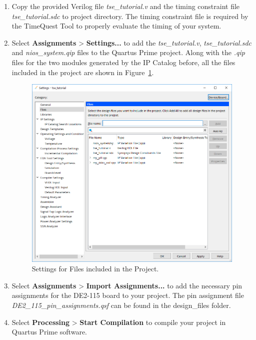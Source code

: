 \documentclass[11pt, twoside, pdftex]{article}
\begin{document}
\begin{enumerate}
	\item Copy the provided Verilog file {\it tse\_tutorial.v} and the timing constraint file {\it tse\_tutorial.sdc} to project directory. The timing constraint file is required by the TimeQuest Tool to properly evaluate the timing of your system.
	\item Select {\bf Assignments} > {\bf Settings...} to add the {\it tse\_tutorial.v}, {\it tse\_tutorial.sdc} and {\it nios\_system.qip} files to the Quartus Prime project. Along with the {\it .qip} files for the two modules generated by the IP Catalog before, all the files included in the project are shown in Figure~\ref{fig:files_settings}. 
	
	\begin{figure}[H]
		\centering
		  \includegraphics[scale=0.6]{figures/files_settings.png}
		\caption{Settings for Files included in the Project.} 
		\label{fig:files_settings}
	\end{figure}
			
	\item Select {\bf Assignments} > {\bf Import Assignments...} to add the necessary pin assignments for the DE2-115 board to your project. The pin assignment file {\it DE2\_115\_pin\_assignments.qsf} can be found in the design\_files folder.
	\item Select {\bf Processing} > {\bf Start Compilation} to compile your project in Quartus Prime software. 
\end{enumerate}
\end{document}

